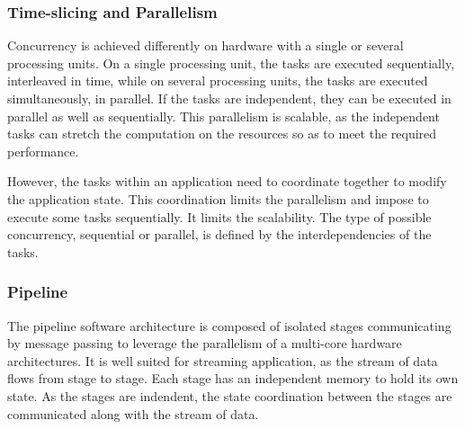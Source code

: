 \subsubsection{Time-slicing and Parallelism}

Concurrency is achieved differently on hardware with a single or several processing units.
On a single processing unit, the tasks are executed sequentially, interleaved in time, while on several processing units, the tasks are executed simultaneously, in parallel.
If the tasks are independent, they can be executed in parallel as well as sequentially.
This parallelism is scalable, as the independent tasks can stretch the computation on the resources so as to meet the required performance.

However, the tasks within an application need to coordinate together to modify the application state.
This coordination limits the parallelism and impose to execute some tasks sequentially.
It limits the scalability.
The type of possible concurrency, sequential or parallel, is defined by the interdependencies of the tasks.



\subsubsection{Pipeline}

The pipeline software architecture is composed of isolated stages communicating by message passing to leverage the parallelism of a multi-core hardware architectures.
It is well suited for streaming application, as the stream of data flows from stage to stage.
Each stage has an independent memory to hold its own state.
As the stages are indendent, the state coordination between the stages are communicated along with the stream of data.


